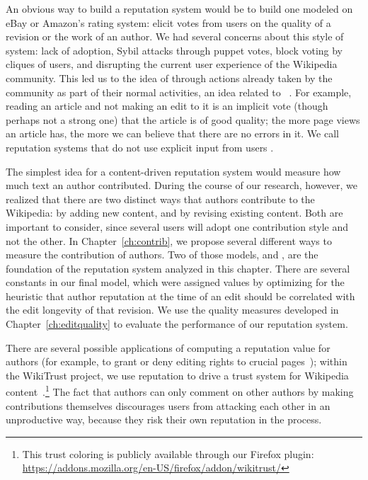An obvious way to build a reputation system would be to build one
modeled on eBay or Amazon's rating system: elicit votes from users
on the quality of a revision or the work of an author.
We had several concerns about this style of system: lack of adoption,
Sybil attacks through puppet votes, block voting by cliques of users, and
disrupting the current user experience of the Wikipedia community.
This led us to the idea of  through
actions already taken by the community as part of their normal activities,
an idea related to ~\cite{Samuelson1938}.
For example, reading an article and not making an edit to it is
an implicit vote (though perhaps not a strong one)
that the article is of good quality; the more page views an article
has, the more we can believe that there are no errors in it.
We call reputation systems that do not use explicit input
from users .


The simplest idea for a content-driven reputation system would measure
how much text an author contributed.
During the course of our research, however, we realized that there are
two distinct ways that authors contribute to the Wikipedia: by adding
new content, and by revising existing content.
Both are important to consider, since several users will
adopt one contribution style and not the other.
In Chapter~\ref{ch:contrib}, we propose several different ways
to measure the contribution of authors.
Two of those models, \tenrevs and \editlong,
are the foundation of the reputation system analyzed
in this chapter.
There are several constants in our final model, which were assigned
values by optimizing for the heuristic that author reputation at
the time of an edit
should be correlated with the edit longevity of that revision.
We use the quality measures developed in Chapter~\ref{ch:editquality}
to evaluate the performance of our reputation system.

\begin{comment}
We introduce in Chapter~\ref{ch:editquality} the notions of
\intro{text longevity}, which describes how added text survives
into later revisions, and \intro{edit longevity}, which measures
how consistent an edit is with later revisions,
to account for these different methods of contribution.
We use the principle that every future author is
implicitly making an evaluation on the work of past authors:
edits and new text that are preserved with later revisions
are judged ``good'' by the community.
\end{comment}


There are several possible applications of computing a reputation
value for authors (for example, to grant or deny editing rights to
crucial pages~\cite{Blaze1996}); within the WikiTrust project,
we use reputation to drive a trust system for
Wikipedia content~\cite{Adler2008b}.\footnote{This trust coloring
is publicly available through our Firefox plugin:
\url{https://addons.mozilla.org/en-US/firefox/addon/wikitrust/}}
The fact that authors can only comment on other authors by
making contributions themselves discourages users from attacking
each other in an unproductive way, because they risk their own reputation in the process.


